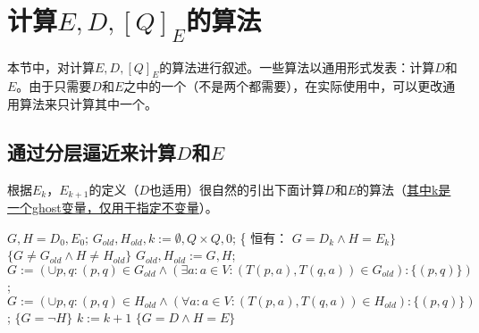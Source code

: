 
\chapter{计算$E,D,[Q]_E$的算法}
本节中，对计算$E,D,[Q]_E$的算法进行叙述。一些算法以通用形式发表：计算$D$和$E$。由于只需要$D$和$E$之中的一个（不是两个都需要），在实际使用中，可以更改通用算法来只计算其中一个。

\section{通过分层逼近来计算$D$和$E$}

根据$E_k$，$E_{k+1}$的定义（$D$也适用）很自然的引出下面计算$D$和$E$的算法（\uline{其中k是一个ghost变量，仅用于指定不变量}）。

\begin{algorithm}
    \caption{}\label{euclid}
    \begin{algorithmic}[1]
        \State $G,H=D_0,E_0$;
        \State $G_{old},H_{old},k:=\emptyset ,Q \times Q,0$;
        \State \{ 恒有： $G=D_k \land H =E_k \}$
            \State $\{G \not= G_{old} \land H \not= H_{old} \}$
            \State $G_{old},H_{old}:=G,H$;
            \State $G:=(\cup  p,q:(p,q)\in G_{old}\land (\exists  a:a \in V : (T(p,a),T(q,a))\in G_{old} ) : \{(p,q)\})$;
            \State $G:=(\cup  p,q:(p,q)\in H_{old}\land (\forall  a:a \in V : (T(p,a),T(q,a))\in H_{old} ) : \{(p,q)\})$;
            \State $\{G=\neg H\}$
            \State $k:=k+1$
        \Until $ \{ G=D \land H=E \}$
    \end{algorithmic}
\end{algorithm}

